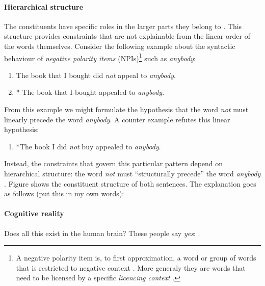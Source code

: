 \paragraph{Hierarchical structure} The constituents have specific roles in the larger parts they belong to \citep{huddleston2002grammar}. This structure provides constraints that are not explainable from the linear order of the words themselves. Consider the following example about the syntactic behaviour of \textit{negative polarity items} (NPIs)\footnote{A negative polarity item is, to first approximation, a word or group of words that is restricted to negative context \citep{everaert2015structures}. More generaly they are words that need to be licensed by a specific \textit{licencing context} \citep{giannakidou2011npi}.} such as \textit{anybody}:
\begin{enumerate}
  \item The book that I bought did \textit{not} appeal to \textit{anybody}.
  \item * The book that I bought appealed to \textit{anybody}.
\end{enumerate}
From this example we might formulate the hypothesis that the word \textit{not} must linearly precede the word \textit{anybody}. A counter example refutes this linear hypothesis:
\begin{enumerate}
  \item *The book I did \textit{not} buy appealed to \textit{anybody}.
\end{enumerate}
Instead, the constraints that govern this particular pattern depend on hierarchical structure: the word \textit{not} must ``structurally precede'' the word \textit{anybody} \citep{everaert2015structures}. Figure \label{ref:trees-npi} shows the constituent structure of both sentences. The explanation goes as follows (put this in my own words): 

\paragraph{Cognitive reality} Does all this exist in the human brain? These people say \textit{yes}: \citep{hale2001earley,levy2008expectation,brennan2016abstract}.

